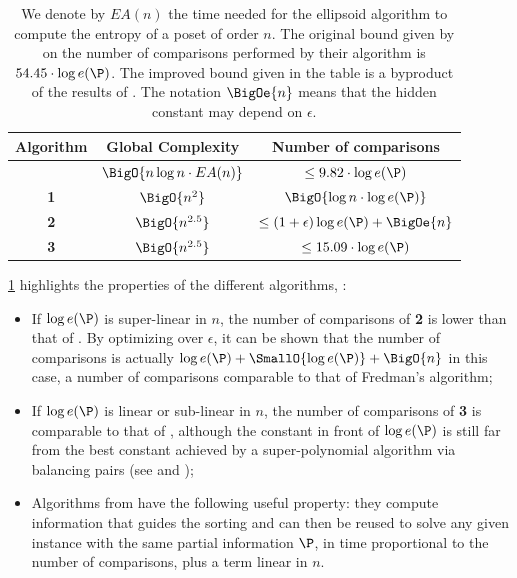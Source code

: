 \begin{table}
	\begin{center}
	\caption{We denote by $E A(n)$ the time needed for the ellipsoid algorithm
to compute the entropy of a poset of order $n$. The original bound given by
\citet*{kahn:1995} on the number of comparisons performed by their algorithm is
$54.45 \cdot \log e(\P)$. The improved bound given in the table is a byproduct
of the results of \citet*{cardinal:2013}. The notation $\BigOe{n}$ means
that the hidden constant may depend on $\epsilon$.}
	\label{tree:supi:table/jcardin}
	\begin{tabular}{|c|c|c|}

	\hline
	Algorithm & Global Complexity & Number of comparisons\\\hline\hline
	\citet*{kahn:1995} & $\BigO{n \log n \cdot E A(n)}$ & $\leq 9.82 \cdot \log
e(\P)$\\\hline\hline
	\citet*{cardinal:2013} \textbf{1} & $ \BigO{n^{2}} $ & $\BigO{\log n \cdot
\log e(\P)}$ \\\hline
	\citet*{cardinal:2013} \textbf{2} & $ \BigO{n^{2.5}} $ & $\leq (1 +
\epsilon) \log e(\P) + \BigOe{n}$ \\\hline
	\citet*{cardinal:2013} \textbf{3} & $ \BigO{n^{2.5}} $ & $\leq 15.09 \cdot
\log e(\P)$ \\\hline

	\end{tabular}
	\end{center}
\end{table}


\ref{tree:supi:table/jcardin} highlights the properties of the different
algorithms, \ie:

\begin{itemize}

\item If $\log e(\P)$ is super-linear in $n$, the number of comparisons of
\citet*{cardinal:2013} \textbf{2} is lower than that of \citet*{kahn:1995}. By
optimizing over $\epsilon$, it can be shown that the number of comparisons is
actually $\log e(\P) + \SmallO{\log e(\P)} + \BigO{n}$ in this case, a number of
comparisons comparable to that of Fredman’s algorithm;

\item If $\log e(\P)$ is linear or sub-linear in $n$, the number of comparisons
of \citet*{cardinal:2013} \textbf{3} is comparable to that of
\citet*{kahn:1995}, although the constant in front of $\log e(\P)$ is still far
from the best constant achieved by a super-polynomial algorithm via balancing
pairs (see \citet*{brightwell1995balancing} and
\citet*{brightwell1999balanced});

\item Algorithms from \citet*{cardinal:2013} have the following useful
property: they compute information that guides the sorting and can then be
reused to solve any given instance with the same partial information $\P$, in
time proportional to the number of comparisons, plus a term linear in $n$.

\end{itemize}

